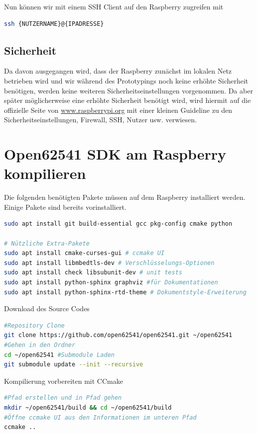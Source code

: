 Nun können wir mit einem SSH Client auf den Raspberry zugreifen mit
\begin{lstlisting}[language=Bash]
 ssh {NUTZERNAME}@{IPADRESSE}
\end{lstlisting}
\subsection{Sicherheit}
Da davon ausgegangen wird, dass der Raspberry zunächst im lokalen Netz betrieben wird und wir während des Prototypings noch keine erhöhte Sicherheit benötigen, werden keine weiteren Sicherheitseinstellungen vorgenommen. Da aber später möglicherweise eine erhöhte Sicherheit benötigt wird, wird hiermit auf die offizielle Seite von \hyperref[https://www.raspberrypi.org/documentation/configuration/security.md 
]{www.raspberrypi.org} mit einer kleinen Guideline zu den Sicherheitseinstellungen, Firewall, SSH, Nutzer usw. verwiesen.
\clearpage
\section{Open62541 SDK am Raspberry kompilieren}\label{sec:open62541}
Die folgenden benötigten Pakete müssen auf dem Raspberry installiert werden. Einige Pakete sind bereits vorinstalliert.

\begin{lstlisting}[language=Bash]
sudo apt install git build-essential gcc pkg-config cmake python

# Nützliche Extra-Pakete
sudo apt install cmake-curses-gui # ccmake UI
sudo apt install libmbedtls-dev # Verschlüsselungs-Optionen
sudo apt install check libsubunit-dev # unit tests
sudo apt install python-sphinx graphviz #für Dokumentationen
sudo apt install python-sphinx-rtd-theme # Dokumentstyle-Erweiterung
\end{lstlisting}

Download des Source Codes
\begin{lstlisting}[language=Bash]
#Repository Clone
git clone https://github.com/open62541/open62541.git ~/open62541
#Gehen in den Ordner
cd ~/open62541 #Submodule Laden
git submodule update --init --recursive
\end{lstlisting}

Kompilierung vorbereiten mit CCmake
\begin{lstlisting}[language=Bash]
#Pfad erstellen und in Pfad gehen
mkdir ~/open62541/build && cd ~/open62541/build
#Öffne ccmake UI aus den Informationen im unteren Pfad
ccmake ..
\end{lstlisting}

